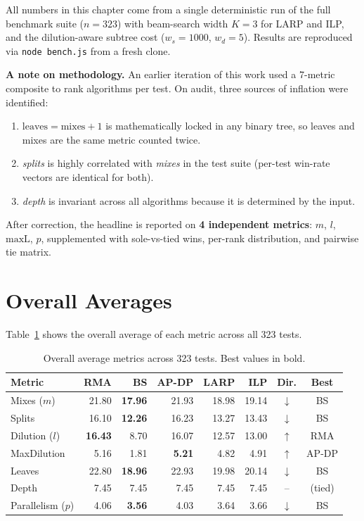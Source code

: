
All numbers in this chapter come from a single deterministic run of the full benchmark suite ($n = 323$) with beam-search width $K = 3$ for LARP and ILP, and the dilution-aware subtree cost ($w_s = 1000$, $w_d = 5$). Results are reproduced via \texttt{node bench.js} from a fresh clone.

\textbf{A note on methodology.} An earlier iteration of this work used a 7-metric composite to rank algorithms per test. On audit, three sources of inflation were identified:
\begin{enumerate}
    \item $\text{leaves} = \text{mixes} + 1$ is mathematically locked in any binary tree, so leaves and mixes are the same metric counted twice.
    \item \textit{splits} is highly correlated with \textit{mixes} in the test suite (per-test win-rate vectors are identical for both).
    \item \textit{depth} is invariant across all algorithms because it is determined by the input.
\end{enumerate}
After correction, the headline is reported on \textbf{4 independent metrics}: $m$, $l$, $\text{maxL}$, $p$, supplemented with sole-vs-tied wins, per-rank distribution, and pairwise tie matrix.

\section{Overall Averages}

Table~\ref{tab:overall_avg} shows the overall average of each metric across all 323 tests.

\begin{table}[H]
\centering
\caption{Overall average metrics across 323 tests. Best values in bold.}
\label{tab:overall_avg}
\begin{tabular}{|l|r|r|r|r|r|c|c|}
\hline
\textbf{Metric} & \textbf{RMA} & \textbf{BS} & \textbf{AP-DP} & \textbf{LARP} & \textbf{ILP} & \textbf{Dir.} & \textbf{Best} \\
\hline
Mixes ($m$) & 21.80 & \textbf{17.96} & 21.93 & 18.98 & 19.14 & $\downarrow$ & BS \\
\hline
Splits & 16.10 & \textbf{12.26} & 16.23 & 13.27 & 13.43 & $\downarrow$ & BS \\
\hline
Dilution ($l$) & \textbf{16.43} & 8.70 & 16.07 & 12.57 & 13.00 & $\uparrow$ & RMA \\
\hline
MaxDilution & 5.16 & 1.81 & \textbf{5.21} & 4.82 & 4.91 & $\uparrow$ & AP-DP \\
\hline
Leaves & 22.80 & \textbf{18.96} & 22.93 & 19.98 & 20.14 & $\downarrow$ & BS \\
\hline
Depth & 7.45 & 7.45 & 7.45 & 7.45 & 7.45 & -- & (tied) \\
\hline
Parallelism ($p$) & 4.06 & \textbf{3.56} & 4.03 & 3.64 & 3.66 & $\downarrow$ & BS \\
\hline
\end{tabular}
\end{table}

